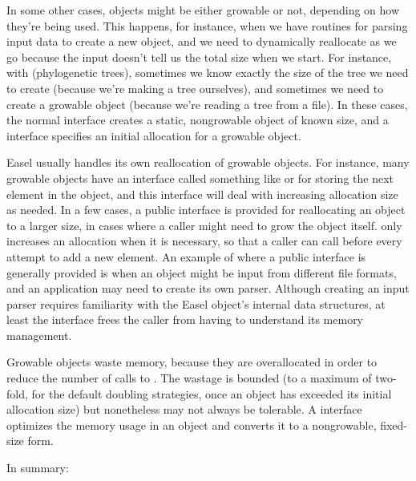 In some other cases, objects might be either growable or not,
depending on how they're being used. This happens, for instance, when
we have routines for parsing input data to create a new object, and we
need to dynamically reallocate as we go because the input doesn't tell
us the total size when we start. For instance, with 
(phylogenetic trees), sometimes we know exactly the size of the tree
we need to create (because we're making a tree ourselves), and
sometimes we need to create a growable object (because we're reading a
tree from a file). In these cases, the normal 
interface creates a static, nongrowable object of known size, and a
 interface specifies an initial allocation
for a growable object.

Easel usually handles its own reallocation of growable objects. For
instance, many growable objects have an interface called something
like  or  for storing the next element
in the object, and this interface will deal with increasing allocation
size as needed.  In a few cases, a public  interface
is provided for reallocating an object to a larger size, in cases
where a caller might need to grow the object itself. 
only increases an allocation when it is necessary, so that a caller
can call  before every attempt to add a new
element. An example of where a public  interface is
generally provided is when an object might be input from different
file formats, and an application may need to create its own
parser. Although creating an input parser requires familiarity with
the Easel object's internal data structures, at least the
 interface frees the caller from having to understand
its memory management.

Growable objects waste memory, because they are overallocated in order
to reduce the number of calls to .  The wastage is
bounded (to a maximum of two-fold, for the default doubling
strategies, once an object has exceeded its initial allocation size)
but nonetheless may not always be tolerable.  A 
interface optimizes the memory usage in an object and converts it to a
nongrowable, fixed-size form. 

In summary: 

